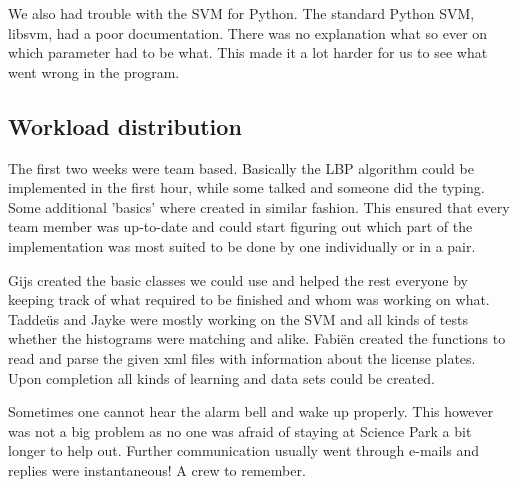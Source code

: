 \documentclass[a4paper]{article}
\begin{document}
We also had trouble with the SVM for Python. The standard Python SVM, libsvm,
had a poor documentation. There was no explanation what so ever on which
parameter had to be what. This made it a lot harder for us to see what went
wrong in the program.


\subsection{Workload distribution}

The first two weeks were team based. Basically the LBP algorithm could be
implemented in the first hour, while some talked and someone did the typing.
Some additional 'basics' where created in similar fashion. This ensured that
every team member was up-to-date and could start figuring out which part of the
implementation was most suited to be done by one individually or in a pair.

Gijs created the basic classes we could use and helped the rest everyone by
keeping track of what required to be finished and whom was working on what.
Tadde\"us and Jayke were mostly working on the SVM and all kinds of tests
whether the histograms were matching and alike. Fabi\"en created the functions
to read and parse the given xml files with information about the license plates.
Upon completion all kinds of learning and data sets could be created.


Sometimes one cannot hear the alarm bell and wake up properly. This however was
not a big problem as no one was afraid of staying at Science Park a bit longer
to help out. Further communication usually went through e-mails and replies were
instantaneous! A crew to remember.
\end{document}
